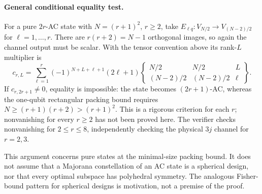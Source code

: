 \documentclass[11pt]{article}
\begin{document}
\paragraph{General conditional equality test.}
For a pure $2r$-AC state with $N=(r+1)^2$, $r\ge2$, take
$E_{\ell q}:V_{N/2}\to V_{(N-2)/2}$ for $\ell=1,\ldots,r$.
There are $r(r+2)=N-1$ orthogonal images, so again the channel output
must be scalar.  With the tensor convention above its rank-$L$
multiplier is
\[
 c_{r,L}=\sum_{\ell=1}^r(-1)^{N+L+\ell+1}(2\ell+1)
 \begin{Bmatrix}
 N/2&N/2&L\\(N-2)/2&(N-2)/2&\ell
 \end{Bmatrix}.
\]
If $c_{r,2r+1}\ne0$, equality is impossible: the state becomes
$(2r+1)$-AC, whereas the one-qubit rectangular packing bound requires
$N\ge(r+1)(r+2)>(r+1)^2$.  This is a rigorous criterion for each $r$;
nonvanishing for every $r\ge2$ has not been proved here.
The verifier checks nonvanishing for $2\le r\le8$, independently
checking the physical $3j$ channel for $r=2,3$.

This argument concerns pure states at the minimal-size packing bound.
It does not assume that a Majorana constellation of an AC state is a
spherical design, nor that every optimal subspace has polyhedral symmetry.
The analogous Fisher-bound pattern for spherical designs is motivation,
not a premise of the proof.
\end{document}
